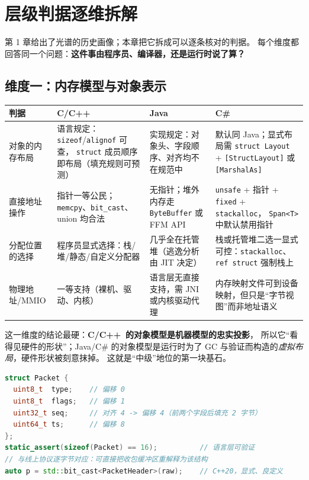 \documentclass[12pt,a4paper,fontset=fandol]{ctexbook}
\newcommand{\Cplus}[1]{C++\,#1}
\begin{document}
\chapter{层级判据逐维拆解}

第 1 章给出了光谱的历史画像；本章把它拆成可以逐条核对的判据。
每个维度都回答同一个问题：\textbf{这件事由程序员、编译器，还是运行时说了算？}

\section{维度一：内存模型与对象表示}

\begin{longtable}{@{}>{\raggedright\arraybackslash}p{}>{\raggedright\arraybackslash}p{}>{\raggedright\arraybackslash}p{}>{\raggedright\arraybackslash}p{}@{}}
\toprule
\textbf{判据} & \textbf{C/\allowbreak{}\Cplus{}} & \textbf{Java} & \textbf{C\#} \\
\midrule
对象的内存布局 & 语言规定：\texttt{sizeof}/\allowbreak{}\texttt{alignof} 可查，
  \texttt{struct} 成员顺序即布局（填充规则可预测） &
  实现规定：对象头、字段顺序、对齐均不在规范中 &
  默认同 Java；显式布局需 \texttt{struct Layout} + \texttt{[Struct\allowbreak{}Layout]}
  或 \texttt{[MarshalAs]} \\
\addlinespace
直接地址操作 & 指针一等公民；\texttt{memcpy}、\texttt{bit\_cast}、union 均合法 &
  无指针；堆外内存走 \texttt{ByteBuffer} 或 FFM API &
  \texttt{unsafe} + 指针 + \texttt{fixed} + \texttt{stackalloc}，
  \texttt{Span<T>} 中默认禁用指针 \\
\addlinespace
分配位置的选择 & 程序员显式选择：栈/堆/静态/自定义分配器 &
  几乎全在托管堆（逃逸分析由 JIT 决定） &
  栈或托管堆二选一显式可控：\texttt{stackalloc}、\texttt{ref struct}
  强制栈上 \\
\addlinespace
物理地址/MMIO & 一等支持（裸机、驱动、内核） &
  语言层无直接支持，需 JNI 或内核驱动代理 &
  内存映射文件可到设备映射，但只是``字节视图''而非地址语义 \\
\bottomrule
\end{longtable}

这一维度的结论最硬：\textbf{C/\allowbreak{}\Cplus{} 的对象模型是机器模型的忠实投影}，
所以它``看得见硬件的形状''；Java/C\# 的对象模型是运行时为了
GC 与验证而构造的\emph{虚拟布局}，硬件形状被刻意抹掉。
这就是``中级''地位的第一块基石。

\begin{lstlisting}[language=C++,caption={C++ 中``布局即语言承诺''的典型三件套}]
struct Packet {
  uint8_t  type;    // 偏移 0
  uint8_t  flags;   // 偏移 1
  uint32_t seq;     // 对齐 4 -> 偏移 4（前两个字段后填充 2 字节）
  uint64_t ts;      // 偏移 8
};
static_assert(sizeof(Packet) == 16);          // 语言层可验证
// 与线上协议逐字节对应：可直接把收包缓冲区重解释为该结构
auto p = std::bit_cast<PacketHeader>(raw);    // C++20，显式、良定义
\end{lstlisting}
\end{document}
